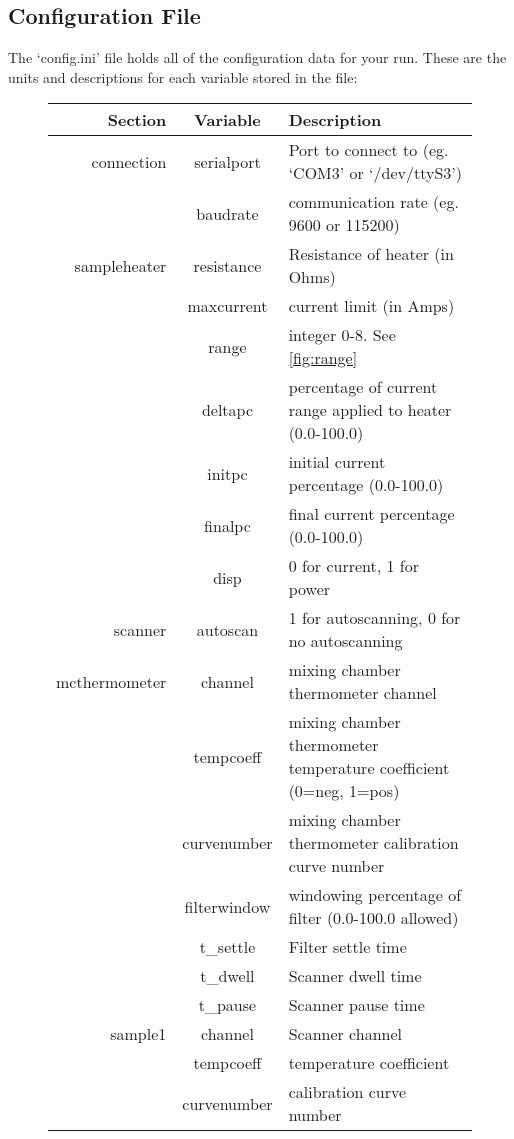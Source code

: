 \documentclass{article}
\begin{document}
\subsection{Configuration File}
The `config.ini' file holds all of the configuration data for your run. These are the units and descriptions for each variable stored in the file: 

\begin{figure}[H]
\centering\begin{tabular}{ | r | c | l  |}
Section & Variable & Description \\ \hline \hline
connection & serialport & Port to connect to (eg. `COM3' or `/dev/ttyS3') \\
	           & baudrate & communication rate (eg. 9600 or 115200)\\ \hline
sampleheater & resistance & Resistance of heater (in Ohms)\\
		      & maxcurrent & current limit (in Amps)\\
		      & range & integer 0-8. See \autoref{fig:range}\\
		      & deltapc & percentage of current range applied to heater (0.0-100.0)\\
		      & initpc & initial current percentage (0.0-100.0)\\
		      & finalpc & final current percentage (0.0-100.0) \\ 
		      & disp & 0 for current, 1 for power \\ \hline
scanner	      & autoscan & 1 for autoscanning, 0 for no autoscanning \\ \hline
mcthermometer & channel & mixing chamber thermometer channel\\
		      & tempcoeff & mixing chamber thermometer temperature coefficient (0=neg, 1=pos)\\
		      & curvenumber & mixing chamber thermometer calibration curve number \\
		      & filterwindow & windowing percentage of filter (0.0-100.0 allowed) \\ 
		      & t\_settle & Filter settle time\\
			& t\_dwell & Scanner dwell time\\
			& t\_pause & Scanner pause time \\ \hline
sample1	      & channel & Scanner channel\\
		      & tempcoeff & temperature coefficient\\	    
		      & curvenumber & calibration curve number \\  

\end{tabular}
\end{figure}
\end{document}
